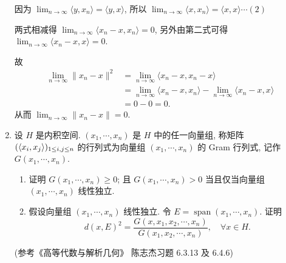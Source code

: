 \begin{enumerate}
\begin{answer}
      因为 $\lim_{n\to\infty}\langle y,x_n\rangle=\langle y,x\rangle$,
      所以 $\lim_{n\to\infty}\langle x,x_n\rangle=\langle x,x\rangle\cdots(2)$

      两式相减得 $\lim_{n\to\infty}\langle x_n-x,x_n\rangle=0$,
      另外由第二式可得 $\lim_{n\to\infty}\langle x_n-x,x\rangle=0$.

      故
      \begin{align*}
          \lim_{n\to\infty}\|x_n-x\|^2
          & =\lim_{n\to\infty}\langle x_n-x,x_n-x\rangle\\
          & =\lim_{n\to\infty}\langle x_n-x,x_n\rangle-\lim_{n\to\infty}\langle x_n-x,x\rangle\\
          & =0-0=0.
      \end{align*}
      从而 $\lim_{n\to\infty}\|x_n-x\|=0$.
    \end{answer}
  \item 设 $H$ 是内积空间. $(x_{1}, \cdots, x_{n})$ 是 $H$ 中的任一向量组,
  称矩阵 $(\left\langle x_i,x_j\right\rangle)_{1\leq i,j\leq n}$ 
  的行列式为向量组 $\left(x_{1},\cdots, x_{n}\right)$ 的 Gram 行列式, 记作 $G(x_{1},\cdots,x_{n})$.
  
    \begin{enumerate}
      \item 证明 $G(x_{1},\cdots,x_{n})\geq 0$; 
      且 $G\left(x_{1},\cdots,x_{n}\right)>0$ 当且仅当向量组 $\left(x_{1}, \cdots, x_{n}\right)$ 线性独立.
      
      \item 假设向量组 $\left(x_{1},\cdots,x_{n}\right)$ 线性独立. 
      令 $E=\operatorname{span}\left(x_{1},\cdots, x_{n}\right)$. 证明
      \[
          d(x, E)^{2}=\frac{G\left(x, x_{1}, x_{2}, \cdots, x_{n}\right)}{G\left(x_{1}, x_{2}, \cdots, x_{n}\right)}, \quad \forall x\in H.
      \]
    \end{enumerate}
    \begin{answer}
      (参考《高等代数与解析几何》 陈志杰习题 6.3.13 及 6.4.6)


\end{answer}
\end{enumerate}

